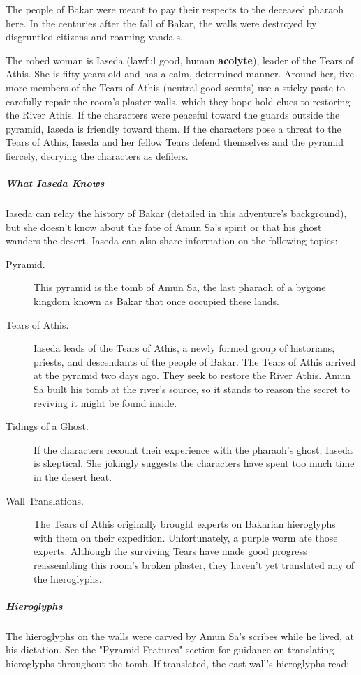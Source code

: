 \documentclass[10pt,a4paper,twoside,bg=print,twocolumn,openany,nodeprecatedcode]{dndbook}
\begin{document}
The people of Bakar were meant to pay their respects to the deceased pharaoh here. In the centuries after the fall of Bakar, the walls were destroyed by disgruntled citizens and roaming vandals.

The robed woman is Iaseda (lawful good, human \textbf{acolyte}), leader of the Tears of Athis. She is fifty years old and has a calm, determined manner. Around her, five more members of the Tears of Athis (neutral good scouts) use a sticky paste to carefully repair the room's plaster walls, which they hope hold clues to restoring the River Athis. If the characters were peaceful toward the guards outside the pyramid, Iaseda is friendly toward them. If the characters pose a threat to the Tears of Athis, Iaseda and her fellow Tears defend themselves and the pyramid fiercely, decrying the characters as defilers.

\subparagraph{What Iaseda Knows}
Iaseda can relay the history of Bakar (detailed in this adventure's background), but she doesn't know about the fate of Amun Sa's spirit or that his ghost wanders the desert. Iaseda can also share information on the following topics:


\begin{description}
\item[Pyramid.]
This pyramid is the tomb of Amun Sa, the last pharaoh of a bygone kingdom known as Bakar that once occupied these lands.
\item[Tears of Athis.]
Iaseda leads of the Tears of Athis, a newly formed group of historians, priests, and descendants of the people of Bakar. The Tears of Athis arrived at the pyramid two days ago. They seek to restore the River Athis. Amun Sa built his tomb at the river's source, so it stands to reason the secret to reviving it might be found inside.
\item[Tidings of a Ghost.]
If the characters recount their experience with the pharaoh's ghost, Iaseda is skeptical. She jokingly suggests the characters have spent too much time in the desert heat.
\item[Wall Translations.]
The Tears of Athis originally brought experts on Bakarian hieroglyphs with them on their expedition. Unfortunately, a purple worm ate those experts. Although the surviving Tears have made good progress reassembling this room's broken plaster, they haven't yet translated any of the hieroglyphs.
\end{description}

\subparagraph{Hieroglyphs}
The hieroglyphs on the walls were carved by Amun Sa's scribes while he lived, at his dictation. See the "Pyramid Features" section for guidance on translating hieroglyphs throughout the tomb. If translated, the east wall's hieroglyphs read:
\end{document}

